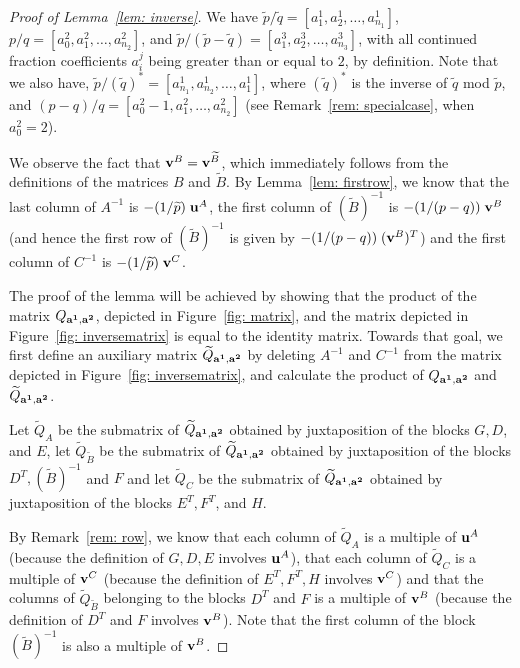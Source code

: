 \documentclass[11pt]{amsart}
\theoremstyle{plain}
\theoremstyle{definition}
\theoremstyle{remark}
\numberwithin{theorem}{section}
\begin{document}
 \begin{proof} [Proof of Lemma~\ref{lem: inverse}]  
We have $\widetilde{p}/\widetilde{q}=[a^1_1, a^1_2, \ldots, a^1_{n_1}]$,  $p/q=[a^2_0, a^2_1, \ldots, a^2_{n_2}]$, and $\widetilde{p}/(\widetilde{p}-\widetilde{q})=[a^3_1, a^3_2, \ldots, a^3_{n_3}]$, with all continued fraction coefficients $a^j_i$ being greater than or equal to $2$, by definition. Note that we also have, $\widetilde{p}/(\widetilde{q})^*=[a^1_{n_1}, a^1_{n_2}, \ldots, a^1_1]$, where $(\widetilde{q})^*$ is the inverse of $\widetilde{q}$ mod $\widetilde{p}$,    and $(p-q)/q=[a^2_0-1, a^2_1, \ldots, a^2_{n_2}]$ (see Remark~\ref{rem: specialcase}, when $a^2_0=2$). 

We observe the fact that ${\bf v}^B={\bf v}^{\widetilde{B}}$, which immediately follows from the definitions of the matrices $B$ and $\widetilde{B}$.  By Lemma~\ref{lem: firstrow},  we know that the last column of $A^{-1}$ is  $-(1/\widetilde{p})\;  {\bf u}^A$,   the first column of  $(\widetilde{B})^{-1}$ is  $-(1/(p-q)) \; {\bf v}^B$ (and hence the first row of 
$(\widetilde{B})^{-1}$ is given by $-(1/(p-q)) \; ({\bf v}^B)^T$) and  the first column of  $C^{-1}$ is  $-(1/\widetilde{p})\;  {\bf v}^C$.

The proof of the lemma will be achieved by showing that the product of the matrix $Q_{{\bf a^1}, {\bf a^2}}$, depicted in Figure~\ref{fig: matrix}, and the matrix depicted in Figure~\ref{fig: inversematrix} is equal to the identity matrix. Towards that goal, we first define an auxiliary matrix $\widetilde{Q}_{{\bf a^1}, {\bf a^2}}$ by deleting $A^{-1}$ and $C^{-1}$ from the matrix depicted in Figure~\ref{fig: inversematrix}, and calculate the product of $Q_{{\bf a^1}, {\bf a^2}}$ and  $\widetilde{Q}_{{\bf a^1}, {\bf a^2}}$. 

Let $\widetilde{Q}_A$ be the submatrix of $\widetilde{Q}_{{\bf a^1}, {\bf a^2}}$ obtained by juxtaposition of the blocks $G, D$, and $E$, let $\widetilde{Q}_{\widetilde{B}}$ be the submatrix of  $\widetilde{Q}_{{\bf a^1}, {\bf a^2}}$  obtained by juxtaposition of the blocks  $D^T, (\widetilde{B})^{-1}$ and $F$ and let $\widetilde{Q}_C$ be the submatrix of  $\widetilde{Q}_{{\bf a^1}, {\bf a^2}}$ obtained by juxtaposition of the blocks  $E^T, F^T$, and $H$.

By Remark~\ref{rem: row}, we know that each column of $\widetilde{Q}_A$ is a multiple of ${\bf u}^A$ (because  the definition of $G, D, E$ involves ${\bf u}^A$), that each column of $\widetilde{Q}_C$ is a multiple of ${\bf v}^C$ (because  the definition of $E^T, F^T, H$  involves ${\bf v}^C$) and that the columns of $\widetilde{Q}_{\widetilde{B}}$ belonging to the blocks $D^T$ and  $F$  is a multiple of ${\bf v}^B$ (because the definition of $D^T$ and  $F$  involves ${\bf v}^B$). 
Note that the first column of the block $(\widetilde{B})^{-1}$ is also a multiple of ${\bf v}^B$.   


\end{proof}
\end{document}

